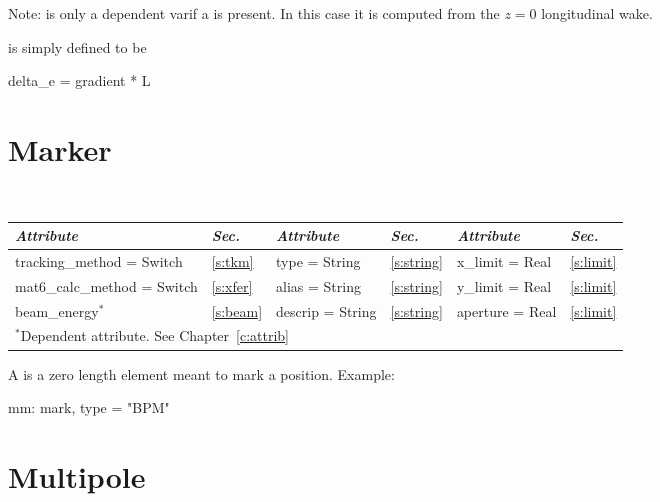 {{Note:   is only a dependent varif a  is present. In this case
it is computed from the $z = 0$ longitudinal wake. 

 is simply defined to be
\begin{example}
  delta_e = gradient * L
\end{example}


\section{Marker}
\label{s:mark}

\begin{center}
\tt
\begin{tabular}{|l|l||l|l||l|l|} \hline
  {\sl Attribute} & {\sl Sec.}  & {\sl Attribute} & {\sl Sec.} & {\sl Attribute} & {\sl Sec.} \\ \hline
  tracking\_method = Switch    & \ref{s:tkm}  &  type = String      & \ref{s:string} & x\_limit = Real  & \ref{s:limit} \\ \hline 
  mat6\_calc\_method = Switch  & \ref{s:xfer} &  alias = String     & \ref{s:string} & y\_limit = Real  & \ref{s:limit} \\ \hline 
  beam\_energy$^*$             & \ref{s:beam} &  descrip = String   & \ref{s:string} & aperture = Real  & \ref{s:limit} \\ \hline 
  \multicolumn{6}{l}{\small $^*$Dependent attribute. See Chapter~\ref{c:attrib}} \\
\end{tabular}
\end{center}
\toffset

A  is a zero length element meant to mark a position.
Example:
\begin{example}
  mm: mark, type = "BPM"
\end{example}

\section{Multipole}
\label{s:mult}

}}

